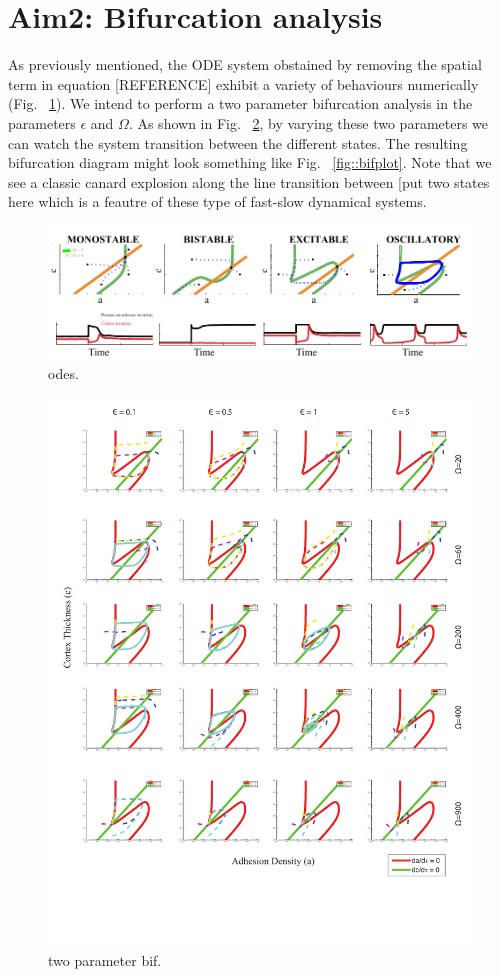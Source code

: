 \section{Aim2: Bifurcation analysis}

As previously mentioned, the ODE system obstained by removing the spatial term in equation {\color{red}[REFERENCE] } exhibit a variety of behaviours numerically (Fig. ~\ref{fig::odeanal}). We intend to perform a two parameter bifurcation analysis in the parameters $\epsilon$ and $\Omega$. As shown in Fig. ~\ref{fig::epsomega}, by varying these two parameters we can watch the system transition between the different states. The resulting bifurcation diagram might look something like Fig. ~\ref{fig::bifplot}. Note that we see a classic canard explosion along the line transition between {\color{red}[put two states here }  which is a feautre of these type of fast-slow dynamical systems.


\begin{figure}[h]
\centering
\captionsetup{width=\linewidth}
\includegraphics[width=4.5in]{Project2/figs/ODE_Analysis.pdf}
\caption{odes.}
\label{fig::odeanal}
\end{figure}

\begin{figure}[h]
\centering
\captionsetup{width=\linewidth}
\includegraphics[width=4.5in]{Project2/figs/Epislon_omega.pdf}
\caption{two parameter bif.}
\label{fig::epsomega}
\end{figure}


